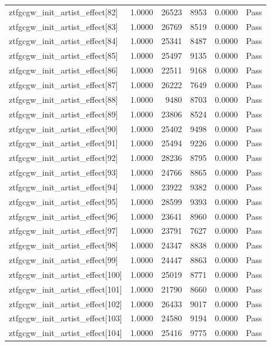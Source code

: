 \begin{table}[htbp]
\begin{tabular}{llrrll}
ztfgcgw\_init\_artist\_effect[82] & 1.0000 & 26523 & 8953 & 0.0000 & Pass \\
ztfgcgw\_init\_artist\_effect[83] & 1.0000 & 26769 & 8519 & 0.0000 & Pass \\
ztfgcgw\_init\_artist\_effect[84] & 1.0000 & 25341 & 8487 & 0.0000 & Pass \\
ztfgcgw\_init\_artist\_effect[85] & 1.0000 & 25497 & 9135 & 0.0000 & Pass \\
ztfgcgw\_init\_artist\_effect[86] & 1.0000 & 22511 & 9168 & 0.0000 & Pass \\
ztfgcgw\_init\_artist\_effect[87] & 1.0000 & 26222 & 7649 & 0.0000 & Pass \\
ztfgcgw\_init\_artist\_effect[88] & 1.0000 & 9480 & 8703 & 0.0000 & Pass \\
ztfgcgw\_init\_artist\_effect[89] & 1.0000 & 23806 & 8524 & 0.0000 & Pass \\
ztfgcgw\_init\_artist\_effect[90] & 1.0000 & 25402 & 9498 & 0.0000 & Pass \\
ztfgcgw\_init\_artist\_effect[91] & 1.0000 & 25494 & 9226 & 0.0000 & Pass \\
ztfgcgw\_init\_artist\_effect[92] & 1.0000 & 28236 & 8795 & 0.0000 & Pass \\
ztfgcgw\_init\_artist\_effect[93] & 1.0000 & 24766 & 8865 & 0.0000 & Pass \\
ztfgcgw\_init\_artist\_effect[94] & 1.0000 & 23922 & 9382 & 0.0000 & Pass \\
ztfgcgw\_init\_artist\_effect[95] & 1.0000 & 28599 & 9393 & 0.0000 & Pass \\
ztfgcgw\_init\_artist\_effect[96] & 1.0000 & 23641 & 8960 & 0.0000 & Pass \\
ztfgcgw\_init\_artist\_effect[97] & 1.0000 & 23791 & 7627 & 0.0000 & Pass \\
ztfgcgw\_init\_artist\_effect[98] & 1.0000 & 24347 & 8838 & 0.0000 & Pass \\
ztfgcgw\_init\_artist\_effect[99] & 1.0000 & 24447 & 8863 & 0.0000 & Pass \\
ztfgcgw\_init\_artist\_effect[100] & 1.0000 & 25019 & 8771 & 0.0000 & Pass \\
ztfgcgw\_init\_artist\_effect[101] & 1.0000 & 21790 & 8660 & 0.0000 & Pass \\
ztfgcgw\_init\_artist\_effect[102] & 1.0000 & 26433 & 9017 & 0.0000 & Pass \\
ztfgcgw\_init\_artist\_effect[103] & 1.0000 & 24580 & 9194 & 0.0000 & Pass \\
ztfgcgw\_init\_artist\_effect[104] & 1.0000 & 25416 & 9775 & 0.0000 & Pass \\

\end{tabular}
\end{table}
